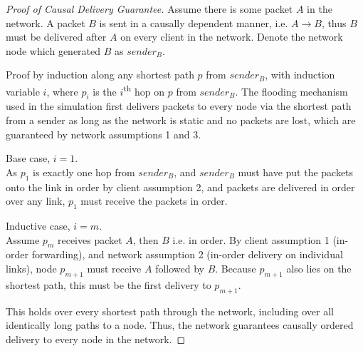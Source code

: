 \documentclass[12pt,a4paper,twoside,openright]{report}
\begin{document}
		\begin{proof}[Proof of Causal Delivery Guarantee]
		
		Assume there is some packet $A$ in the network. A packet $B$ is sent in a causally dependent manner, i.e. $A \rightarrow B$, thus $B$ must be delivered after $A$ on every client in the network. Denote the network node which generated $B$ as $sender_B$.
		
		Proof by induction along any shortest path $p$ from $sender_B$, with induction variable $i$, where $p_i$ is the $i$\textsuperscript{th} hop on $p$ from $sender_B$. The flooding mechanism used in the simulation first delivers packets to every node via the shortest path from a sender as long as the network is static and no packets are lost, which are guaranteed by network assumptions 1 and 3.
		
		Base case, $i = 1$.\\
		As $p_1$ is exactly one hop from $sender_B$, and $sender_B$ must have put the packets onto the link in order by client assumption 2, and packets are delivered in order over any link, $p_1$ must receive the packets in order.
		
		Inductive case, $i = m$.\\
		Assume $p_m$ receives packet $A$, then $B$ i.e. in order. By client assumption 1 (in-order forwarding), and network assumption 2 (in-order delivery on individual links), node $p_{m+1}$ must receive $A$ followed by $B$. Because $p_{m+1}$ also lies on the shortest path, this must be the first delivery to $p_{m+1}$.
		
		This holds over every shortest path through the network, including over all identically long paths to a node. Thus, the network guarantees causally ordered delivery to every node in the network.
		
		
		

\end{proof}
\end{document}
